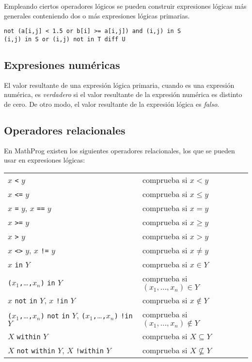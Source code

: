 \documentclass[11pt,spanish]{report}
\def\para#1{\noindent{\bf#1}}
\begin{document}
Empleando ciertos operadores lógicos se pueden construir expresiones lógicas más generales conteniendo dos o más expresiones lógicas primarias.

\para{Ejemplos}

\begin{verbatim}
not (a[i,j] < 1.5 or b[i] >= a[i,j]) and (i,j) in S
(i,j) in S or (i,j) not in T diff U
\end{verbatim}

\vspace*{-8pt}

\subsection{Expresiones numéricas}

El valor resultante de una expresión lógica primaria, cuando es una expresión numérica, es {\it verdadero} si el valor resultante de la expresión numérica es distinto de cero. De otro modo, el valor resultante de la expresión lógica es {\it falso}.

\vspace*{-8pt}

\subsection{Operadores relacionales}

En MathProg existen los siguientes operadores relacionales, los que se pueden usar en expresiones lógicas:

\begin{tabular}{@{}ll@{}}
$x$ {\tt<} $y$&comprueba si $x<y$\\
$x$ {\tt<=} $y$&comprueba si $x\leq y$\\
$x$ {\tt=} $y$, $x$ {\tt==} $y$&comprueba si $x=y$\\
$x$ {\tt>=} $y$&comprueba si $x\geq y$\\
$x$ {\tt>} $y$&comprueba si $x>y$\\
$x$ {\tt<>} $y$, $x$ {\tt!=} $y$&comprueba si $x\neq y$\\
$x$ {\tt in} $Y$&comprueba si $x\in Y$\\
{\tt(}$x_1${\tt,}\dots{\tt,}$x_n${\tt)} {\tt in} $Y$&comprueba si
$(x_1,\dots,x_n)\in Y$\\
$x$ {\tt not} {\tt in} $Y$, $x$ {\tt!in} $Y$&comprueba si $x\not\in Y$\\
{\tt(}$x_1${\tt,}\dots{\tt,}$x_n${\tt)} {\tt not} {\tt in} $Y$,
{\tt(}$x_1${\tt,}\dots{\tt,}$x_n${\tt)} {\tt !in} $Y$&comprueba si
$(x_1,\dots,x_n)\not\in Y$\\
$X$ {\tt within} $Y$&comprueba si $X\subseteq Y$\\
$X$ {\tt not} {\tt within} $Y$, $X$ {\tt !within} $Y$&comprueba si
$X\not\subseteq Y$\\
\end{tabular}
\end{document}
